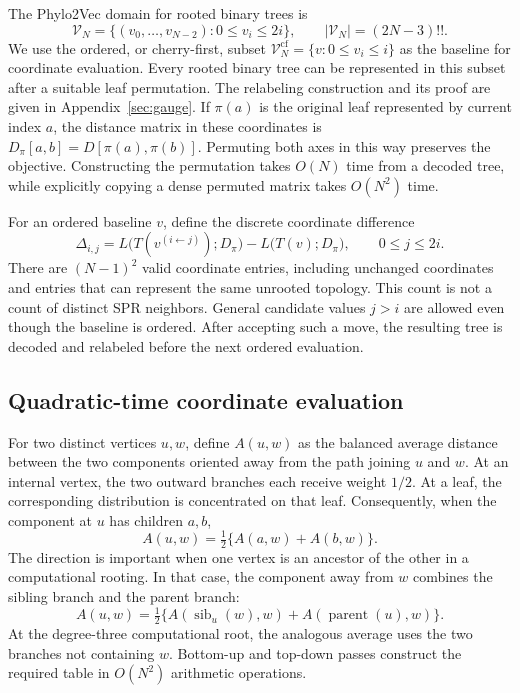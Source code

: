 \documentclass[11pt,a4paper]{article}
\makeatletter
\DeclareRobustCommand{\_}{\ifmmode\nfss@text{\textunderscore}\else\textunderscore\allowbreak\fi}
\theoremstyle{definition}
\makeatother
\begin{document}
The Phylo2Vec domain for rooted binary trees is
\begin{equation}
 \mathcal V_N=\{(v_0,\ldots,v_{N-2}):0\leq v_i\leq2i\},
 \qquad |\mathcal V_N|=(2N-3)!!.
 \label{eq:phylo2vec_space}
\end{equation}
We use the ordered, or cherry-first, subset
$\mathcal V_N^{\mathrm{cf}}=\{v:0\leq v_i\leq i\}$ as the baseline for coordinate evaluation.
Every rooted binary tree can be represented in this subset after a suitable leaf permutation.
The relabeling construction and its proof are given in Appendix~\ref{sec:gauge}.
If $\pi(a)$ is the original leaf represented by current index $a$, the distance matrix in these coordinates is
$D_\pi[a,b]=D[\pi(a),\pi(b)]$.
Permuting both axes in this way preserves the objective.
Constructing the permutation takes $O(N)$ time from a decoded tree, while explicitly copying a dense permuted matrix takes $O(N^2)$ time.

For an ordered baseline $v$, define the discrete coordinate difference
\begin{equation}
 \Delta_{i,j}
 =L\bigl(T(v^{(i\leftarrow j)});D_\pi\bigr)
  -L\bigl(T(v);D_\pi\bigr),\qquad 0\leq j\leq2i.
 \label{eq:discrete_gradient}
\end{equation}
There are $(N-1)^2$ valid coordinate entries, including unchanged coordinates and entries that can represent the same unrooted topology.
This count is not a count of distinct SPR neighbors.
General candidate values $j>i$ are allowed even though the baseline is ordered.
After accepting such a move, the resulting tree is decoded and relabeled before the next ordered evaluation.

\subsection{Quadratic-time coordinate evaluation}

For two distinct vertices $u,w$, define $A(u,w)$ as the balanced average distance between the two components oriented away from the path joining $u$ and $w$.
At an internal vertex, the two outward branches each receive weight $1/2$.
At a leaf, the corresponding distribution is concentrated on that leaf.
Consequently, when the component at $u$ has children $a,b$,
\begin{equation}
 A(u,w)=\tfrac12\{A(a,w)+A(b,w)\}.
 \label{eq:bottom_up}
\end{equation}
The direction is important when one vertex is an ancestor of the other in a computational rooting.
In that case, the component away from $w$ combines the sibling branch and the parent branch:
\begin{equation}
 A(u,w)=\tfrac12\{A(\operatorname{sib}_u(w),w)
                         +A(\operatorname{parent}(u),w)\}.
 \label{eq:top_down}
\end{equation}
At the degree-three computational root, the analogous average uses the two branches not containing $w$.
Bottom-up and top-down passes construct the required table in $O(N^2)$ arithmetic operations.
\end{document}
